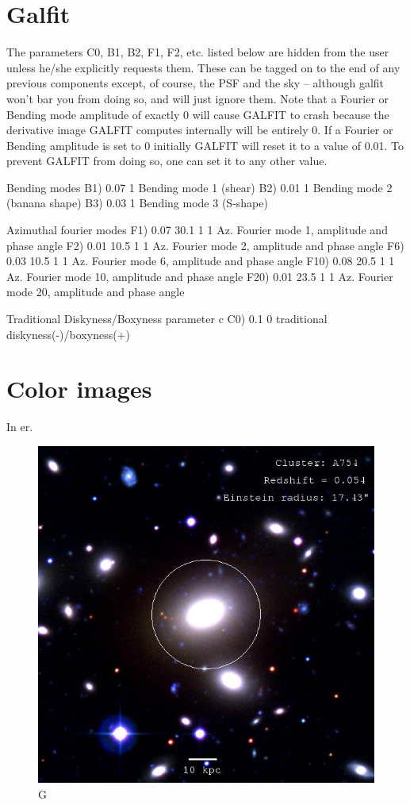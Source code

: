 \section{Galfit}

 The parameters C0, B1, B2, F1, F2, etc. listed below are hidden 
 from the user unless he/she explicitly requests them.  These can  be tagged on to the end of any previous components except, of 
 course, the PSF and the sky -- although galfit won't bar you from doing 
 so, and will just ignore them.  Note that a Fourier or Bending mode 
 amplitude of exactly 0 will cause GALFIT to crash because the 
 derivative image GALFIT computes internally will be entirely 0.  If a 
 Fourier or Bending amplitude is set to 0 initially GALFIT will reset it  
 to a value of 0.01.  To prevent GALFIT from doing so, one can set it to any 
 other value.

  Bending modes
B1)  0.07      1        Bending mode 1 (shear)
B2)  0.01      1        Bending mode 2 (banana shape)
B3)  0.03      1        Bending mode 3 (S-shape)

  Azimuthal fourier modes
F1)  0.07  30.1  1  1   Az. Fourier mode 1, amplitude and phase angle
F2)  0.01  10.5  1  1   Az. Fourier mode 2, amplitude and phase angle
F6)  0.03  10.5  1  1  Az. Fourier mode 6, amplitude and phase angle
F10)  0.08  20.5  1  1   Az. Fourier mode 10, amplitude and phase angle
F20)  0.01  23.5  1  1   Az. Fourier mode 20, amplitude and phase angle

  Traditional Diskyness/Boxyness parameter c
C0) 0.1         0       traditional diskyness(-)/boxyness(+)

\section{Color images}


In er.  

\begin{figure}[H]
\centering
\includegraphics[width=12cm]{images/cA754.jpg}
\caption[M]{G}
\end{figure}

